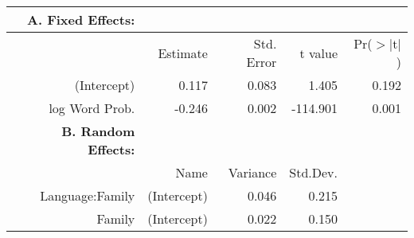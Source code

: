 \begin{tabular}{rrrrr}
 {\bf A. Fixed Effects:} \\
\hline
 & Estimate & Std. Error & t value & Pr($>$$|$t$|$) \\ 
  \hline
(Intercept) & 0.117 & 0.083 & 1.405 & 0.192 \\ 
  log Word Prob. & -0.246 & 0.002 & -114.901 & 0.001 \\ 

\hline \hline
{\bf B. Random Effects:} \\
\hline
& Name & Variance & Std.Dev. \\
\hline
Language:Family & (Intercept) & 0.046 & 0.215 \\
Family & (Intercept) & 0.022 & 0.150 \\
\end{tabular}
